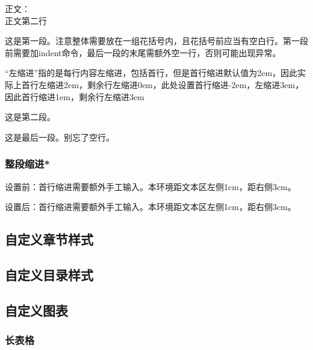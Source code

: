 \documentclass[twoside]{ctexart}
\begin{document}
            正文：\\ %
            正文第二行\par %
            {\setlength{\parindent}{-2em} %
            \setlength{\leftskip}{3em} %
            这是第一段。注意整体需要放在一组花括号内，且花括号前应当有空白行。第一段前需要加indent命令，最后一段的末尾需额外空一行，否则可能出现异常。

            ``左缩进''指的是每行内容左缩进，包括首行，但是首行缩进默认值为2em，因此实际上首行左缩进2em，剩余行左缩进0em，此处设置首行缩进-2em，左缩进3em，因此首行缩进1em，剩余行左缩进3em

            这是第二段。

            这是最后一段。别忘了空行。\par
            }
            
        \subsubsection{整段缩进*}
            设置前：首行缩进需要额外手工输入。本环境距文本区左侧1cm，距右侧3cm。

            \begin{adjustwidth}{1cm}{3cm}
                \indent 设置后：首行缩进需要额外手工输入。本环境距文本区左侧1cm，距右侧3cm。
            \end{adjustwidth}

    \subsection{自定义章节样式}

    \subsection{自定义目录样式}

    \subsection{自定义图表}
        \subsubsection{长表格}
\end{document}

